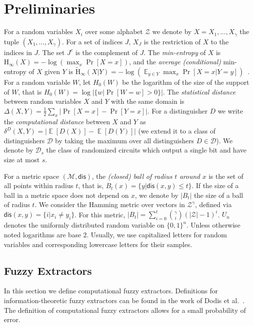 \documentclass[11pt]{article}
\DeclareMathOperator*{\expe}{\mathbb{E}}
\newcommand{\dis}{\ensuremath{\mathsf{dis}}}
\newcommand{\Hoo}{\mathrm{H}_\infty}
\newcommand{\Hav}{\tilde{\mathrm{H}}_\infty}
\begin{document}
\section{Preliminaries}
\label{sec:preliminaries}
For a random variables $X_i$ over some alphabet $\mathcal{Z}$ we denote by $X = X_1,..., X_\gamma$  the tuple $(X_1,\dots, X_\gamma)$.  For a set of indices $J$, $X_{J}$ is the restriction of $X$ to the indices in $J$.  The set $J^c$ is the complement of $J$.  The {\em min-entropy} of $X$ is $\Hoo(X) = -\log(\max_x \Pr[X=x])$,
and the {\em average (conditional)} min-entropy of $X$ given $Y$ is  $\Hav(X|Y) = -\log(\expe_{y\in Y} \max_{x} \Pr[X=x|Y=y])$~\cite[Section 2.4]{DBLP:journals/siamcomp/DodisORS08}.   For a random variable $W$, let $H_0(W)$ be the logarithm of the size of the support of $W$,  that is $H_0(W) = \log |\{w | \Pr[W=w]>0\}|$.
The {\em statistical distance} between random variables $X$ and $Y$ with the same domain is $\Delta(X,Y) = \frac12 \sum_x |\Pr[X=x] - \Pr[Y=x]|$.
For a distinguisher $D$ we write the \emph{computational distance} between $X$ and $Y$ as $\delta^D(X,Y) = \left| \expe[D(X)]-\expe[D(Y)]\right |$ (we extend it to a class of distinguishers $\mathcal{D}$ by taking the maximum over all distinguishers $D\in\mathcal{D}$).  We denote by $\mathcal{D}_{s}$ the class of randomized circuits which output a single bit and have size at most $s$.

For a metric space $(\mathcal{M}, \dis)$, the \emph{(closed) ball of radius $t$ around $x$} is the set of all points within radius $t$, that is, $B_t(x) = \{y| \dis(x, y)\leq t\}$.  If the size of a ball in a metric space does not depend on $x$, we denote by $|B_t|$ the size of a ball of radius $t$.  We consider the Hamming metric over vectors in $\mathcal{Z}^\gamma$, defined via $\dis(x,y) = \{i | x_i \neq y_i\}$.  For this metric, $|B_t| = \sum_{i=0}^t {\gamma \choose i} (|\mathcal{Z}|-1)^i $.  $U_n$ denotes the uniformly  distributed random variable on $\{0,1\}^n$.  Unless otherwise noted logarithms are base $2$.
Usually, we use capitalized letters for random variables and corresponding lowercase letters for their samples.

\subsection{Fuzzy Extractors}
\label{sec:fuzzy extractors}

In this section we define computational fuzzy extractors.  Definitions for information-theoretic fuzzy extractors can be found in the work of Dodis et al.~\cite[Sections 2.5--4.1]{DBLP:journals/siamcomp/DodisORS08}.  The definition of computational fuzzy extractors allows for a small probability of error.  %
\end{document}

